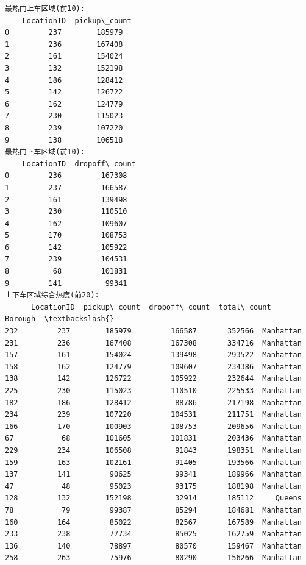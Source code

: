 \documentclass[11pt]{article}
\begin{document}
    \begin{Verbatim}[commandchars=\\\{\}]
最热门上车区域(前10):
    LocationID  pickup\_count
0         237        185979
1         236        167408
2         161        154024
3         132        152198
4         186        128412
5         142        126722
6         162        124779
7         230        115023
8         239        107220
9         138        106518
最热门下车区域(前10):
    LocationID  dropoff\_count
0         236         167308
1         237         166587
2         161         139498
3         230         110510
4         162         109607
5         170         108753
6         142         105922
7         239         104531
8          68         101831
9         141          99341
上下车区域综合热度(前20):
      LocationID  pickup\_count  dropoff\_count  total\_count    Borough  \textbackslash{}
232         237        185979         166587       352566  Manhattan
231         236        167408         167308       334716  Manhattan
157         161        154024         139498       293522  Manhattan
158         162        124779         109607       234386  Manhattan
138         142        126722         105922       232644  Manhattan
225         230        115023         110510       225533  Manhattan
182         186        128412          88786       217198  Manhattan
234         239        107220         104531       211751  Manhattan
166         170        100903         108753       209656  Manhattan
67           68        101605         101831       203436  Manhattan
229         234        106508          91843       198351  Manhattan
159         163        102161          91405       193566  Manhattan
137         141         90625          99341       189966  Manhattan
47           48         95023          93175       188198  Manhattan
128         132        152198          32914       185112     Queens
78           79         99387          85294       184681  Manhattan
160         164         85022          82567       167589  Manhattan
233         238         77734          85025       162759  Manhattan
136         140         78897          80570       159467  Manhattan
258         263         75976          80290       156266  Manhattan


\end{Verbatim}
\end{document}
